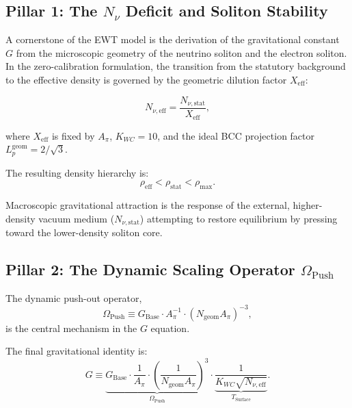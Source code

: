 \documentclass[10pt,a4paper]{article}
\begin{document}
\subsection{Pillar 1: The \(N_\nu\) Deficit and Soliton Stability}
\label{sec:n_nu_stability}

A cornerstone of the EWT model is the derivation of the gravitational constant \(G\) from the microscopic geometry of the neutrino soliton and the electron soliton. In the zero-calibration formulation, the transition from the statutory background to the effective density is governed by the geometric dilution factor \(X_{\text{eff}}\):

\begin{equation}
	N_{\nu,\text{eff}}
	=
	\frac{N_{\nu,\text{stat}}}{X_{\text{eff}}},
\end{equation}

where \(X_{\text{eff}}\) is fixed by \(A_\pi\), \(K_{WC}=10\), and the ideal BCC projection factor \(L_p^{\text{geom}} = 2/\sqrt{3}\).

The resulting density hierarchy is:
\begin{equation}
	\rho_{\text{eff}} < \rho_{\text{stat}} < \rho_{\text{max}}.
\end{equation}

Macroscopic gravitational attraction is the response of the external, higher-density vacuum medium (\(N_{\nu,\text{stat}}\)) attempting to restore equilibrium by pressing toward the lower-density soliton core.

\subsection{Pillar 2: The Dynamic Scaling Operator \(\Omega_{\text{Push}}\)}
\label{sec:Pillar3_pushout_duality}

The dynamic push-out operator,
\begin{equation}
	\Omega_{\text{Push}}
	\equiv
	G_{\text{Base}}
	\cdot
	A_\pi^{-1}
	\cdot
	\left(
	N_{\text{geom}} A_\pi
	\right)^{-3},
\end{equation}
is the central mechanism in the \(G\) equation.

The final gravitational identity is:
\begin{equation}
	G
	\equiv
	\underbrace{
		G_{\text{Base}}
		\cdot
		\frac{1}{A_\pi}
		\cdot
		\left(
		\frac{1}{N_{\text{geom}} A_\pi}
		\right)^3
	}_{\Omega_{\text{Push}}}
	\cdot
	\underbrace{
		\frac{1}{K_{WC} \sqrt{N_{\nu,\text{eff}}}}
	}_{T_{\text{Surface}}}.
\end{equation}
\end{document}
